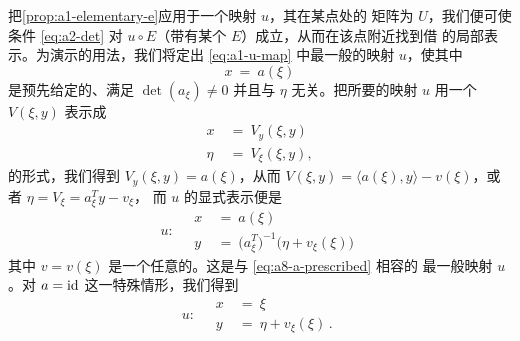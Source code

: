 把\cref{prop:a1-elementary-e}应用于一个\trSymplectic{}映射 $u$，其在某点处的%
\trJacobi{}矩阵为 $U$，我们便可使条件 \eqref{eq:a2-det} 对 $u\circ E$（带有某个%
\trElementary\trSymplectic{}\trTransformation{} $E$）成立，从而在该点附近找到借\trGeneratingFunction{}%
的局部表示。为演示\trGeneratingFunction{}的用法，我们将定出%
 \eqref{eq:a1-u-map} 中最一般的\trSymplectic{}映射 $u$，使其中
\begin{equation}\label{eq:a8-a-prescribed}
x\ =\ a(\xi)
\end{equation}
是预先给定的、满足 $\det(a_{\xi})\neq0$ 并且与 $\eta$ 无关。把所要的映射 $u$ %
用一个\trGeneratingFunction{} $V(\xi,y)$ 表示成
\[
\begin{aligned}
x\ &=\ V_{y}(\xi,y)\\
\eta\ &=\ V_{\xi}(\xi,y),
\end{aligned}
\]
的形式，我们得到 $V_{y}(\xi,y)=a(\xi)$，从而%
 $V(\xi,y)=\langle a(\xi),y\rangle-v(\xi)$，或者 $\eta=V_{\xi}=a_{\xi}^{T}y-v_{\xi}$，%
而 $u$ 的显式表示便是
\begin{equation}\label{eq:a9-explicit-u}
u:\quad
\begin{aligned}
x\ &=\ a(\xi)\\
y\ &=\ \bigl(a_{\xi}^{T}\bigr)^{-1}\bigl(\eta+v_{\xi}(\xi)\bigr)
\end{aligned}
\end{equation}
其中 $v=v(\xi)$ 是一个任意的\trScalarFunction{}。这是与 \eqref{eq:a8-a-prescribed} 相容的%
最一般\trSymplectic{}映射 $u$。对 $a=\mathrm{id}$ 这一特殊情形，我们得到
\begin{equation}\label{eq:a10-id-case}
u:\quad
\begin{aligned}
x\ &=\ \xi\\
y\ &=\ \eta+v_{\xi}(\xi)\,.
\end{aligned}
\end{equation}

